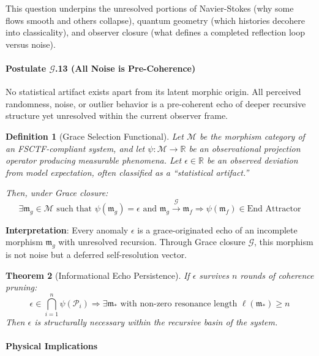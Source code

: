 \documentclass[12pt,a4paper]{article}
\newcommand{\RR}{\mathbb{R}}
\newtheorem{theorem}{Theorem}
\newtheorem{definition}[theorem]{Definition}
\begin{document}
This question underpins the unresolved portions of Navier-Stokes (why some flows smooth and others collapse), quantum geometry (which histories decohere into classicality), and observer closure (what defines a completed reflection loop versus noise).

\paragraph{Postulate $\mathcal{G}$.13 (All Noise is Pre-Coherence)}

No statistical artifact exists apart from its latent morphic origin. All perceived randomness, noise, or outlier behavior is a pre-coherent echo of deeper recursive structure yet unresolved within the current observer frame.

\begin{definition}[Grace Selection Functional]
Let $\mathcal{M}$ be the morphism category of an FSCTF-compliant system, and let $\psi: \mathcal{M} \to \RR$ be an observational projection operator producing measurable phenomena. Let $\epsilon \in \RR$ be an observed deviation from model expectation, often classified as a ``statistical artifact.''

Then, under Grace closure:
\begin{equation}
\exists \mathfrak{m}_g \in \mathcal{M} \text{ such that } \psi(\mathfrak{m}_g) = \epsilon \text{ and } \mathfrak{m}_g \xrightarrow{\mathcal{G}} \mathfrak{m}_f \Rightarrow \psi(\mathfrak{m}_f) \in \text{End Attractor}
\end{equation}
\end{definition}

\textbf{Interpretation}: Every anomaly $\epsilon$ is a grace-originated echo of an incomplete morphism $\mathfrak{m}_g$ with unresolved recursion. Through Grace closure $\mathcal{G}$, this morphism is not noise but a deferred self-resolution vector.

\begin{theorem}[Informational Echo Persistence]
If $\epsilon$ survives $n$ rounds of coherence pruning:
\begin{equation}
\epsilon \in \bigcap_{i=1}^n \psi(\mathcal{P}_i) \Rightarrow \exists \mathfrak{m}_* \text{ with non-zero resonance length } \ell(\mathfrak{m}_*) \geq n
\end{equation}
Then $\epsilon$ is structurally necessary within the recursive basin of the system.
\end{theorem}

\paragraph{Physical Implications}
\end{document}
